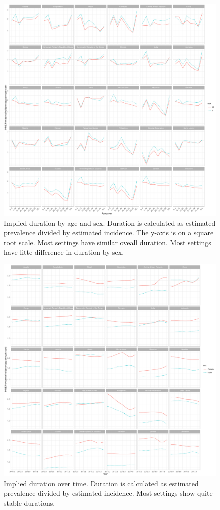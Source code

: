 \documentclass[12pt]{article}
\begin{document}
\begin{figure}
\centering
\includegraphics[width=1\textwidth]{../plots/aF5.pdf}
\caption[Implied duration by age and sex]{Implied duration by age and sex.
  Duration is calculated as estimated prevalence divided by estimated incidence.
The y-axis is on a square root scale. Most settings have similar oveall
duration. Most settings have litte difference in duration by sex.}
\end{figure}

\FloatBarrier

\begin{figure}
\centering
\includegraphics[width=1\textwidth]{../plots/aF6.pdf}
\caption[Implied duration over time]{Implied duration over time. Duration is
  calculated as estimated prevalence divided by estimated incidence. Most
  settings show quite stable durations.}
\end{figure}
\end{document}
